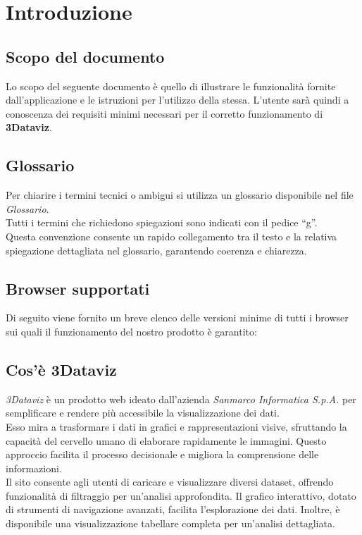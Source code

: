 \section{Introduzione}
\subsection{Scopo del documento}
Lo scopo del seguente documento è quello di illustrare le funzionalità fornite dall’applicazione e le istruzioni
per l’utilizzo della stessa. L’utente sarà quindi a conoscenza dei requisiti minimi necessari per il
corretto funzionamento di \textbf{3Dataviz}.

\subsection{Glossario}
Per chiarire i termini tecnici o ambigui si utilizza un glossario disponibile nel file \textit{Glossario}.\\
Tutti i termini che richiedono spiegazioni sono indicati con il pedice “g”. \\
Questa convenzione consente un rapido collegamento tra il testo e la relativa spiegazione dettagliata nel glossario, garantendo coerenza e chiarezza.

\subsection{Browser supportati}
Di seguito viene fornito un breve elenco delle versioni minime di tutti i browser sui quali il funzionamento
del nostro prodotto è garantito:

\subsection{Cos'è 3Dataviz}
\textit{3Dataviz} è un prodotto web ideato dall'azienda \textit{Sanmarco Informatica S.p.A.} per semplificare e rendere più accessibile la visualizzazione dei dati.\\
Esso mira a trasformare i dati in grafici e rappresentazioni visive, sfruttando la capacità del cervello umano di elaborare rapidamente le immagini. 
Questo approccio facilita il processo decisionale e migliora la comprensione delle informazioni.\\

Il sito consente agli utenti di caricare e visualizzare diversi dataset, offrendo funzionalità di filtraggio per un'analisi approfondita.
Il grafico interattivo, dotato di strumenti di navigazione avanzati, facilita l'esplorazione dei dati. 
Inoltre, è disponibile una visualizzazione tabellare completa per un'analisi dettagliata.\\

